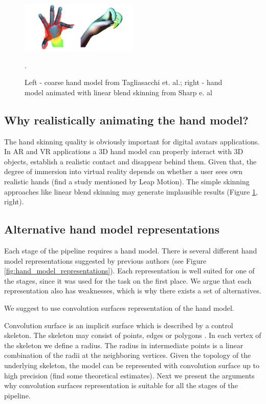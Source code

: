 \begin{figure}[h!] 
	\centering
	\hspace{-2em}
	\includegraphics[width=0.5\textwidth]{fig/coarse_hand_model_and_lbs}
	\caption{Left - coarse hand model  from Tagliasacchi et. al.; right - hand model animated with linear blend skinning from Sharp e. al }.
	\label{fig:coarse_hand_model_and_lbs}
\end{figure}

\subsection{Why realistically animating the hand model?}

The hand skinning quality is obviously important for digital avatars applications. In AR and VR applications a 3D hand model can properly interact with 3D objects, establish a realistic contact and disappear behind them. Given that, the degree of immersion into virtual reality depends on whether a user sees own realistic hands \textcolor{mygray}{(find a study mentioned by Leap Motion).} The simple skinning approaches like linear blend skinning may generate implausible results  (Figure \ref{fig:coarse_hand_model_and_lbs}, right).

\subsection{Alternative hand model representations}
Each stage of the pipeline requires a hand model. There is several different hand model representations suggested by previous authors (see Figure \ref{fig:hand_model_representations}). Each representation is well suited for one of the stages, since it was used for the task on the first place. We argue that each representation also has weaknesses, which is why there exists a set of alternatives.

We suggest to use convolution surfaces representation of the hand model. 

Convolution surface is an implicit surface which is described by a control skeleton. The skeleton may consist of points, edges or polygons \cite{bloomenthal1991convolution}. In each vertex of the skeleton we define a radius. The radius in intermediate points is a linear combination of the radii at the neighboring vertices. Given the topology of the underlying skeleton, the model can be represented with convolution surface up to high precision \textcolor{mygray}{(find some theoretical estimates).} Next we present the arguments why convolution surfaces representation is suitable for all the stages of the pipeline.

